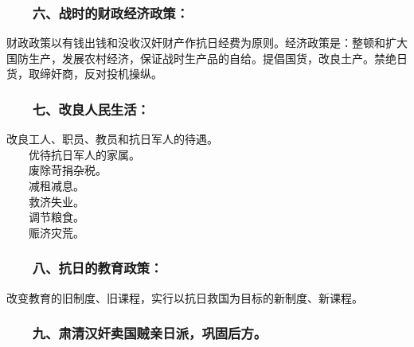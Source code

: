 \documentclass[cn,11pt,chinese]{elegantbook}
\def\myformat#1{\hfil\hfil #1}
\begin{document}
\subsubsection*{\myformat{　　六、战时的财政经济政策：}}
财政政策以有钱出钱和没收汉奸财产作抗日经费为原则。经济政策是：整顿和扩大国防生产，发展农村经济，保证战时生产品的自给。提倡国货，改良土产。禁绝日货，取缔奸商，反对投机操纵。\\
\subsubsection*{\myformat{　　七、改良人民生活：}}
改良工人、职员、教员和抗日军人的待遇。\\
　　优待抗日军人的家属。\\
　　废除苛捐杂税。\\
　　减租减息。\\
　　救济失业。\\
　　调节粮食。\\
　　赈济灾荒。\\
\subsubsection*{\myformat{　　八、抗日的教育政策：}}
改变教育的旧制度、旧课程，实行以抗日救国为目标的新制度、新课程。\\
\subsubsection*{\myformat{　　九、肃清汉奸卖国贼亲日派，巩固后方。}}
\end{document}
